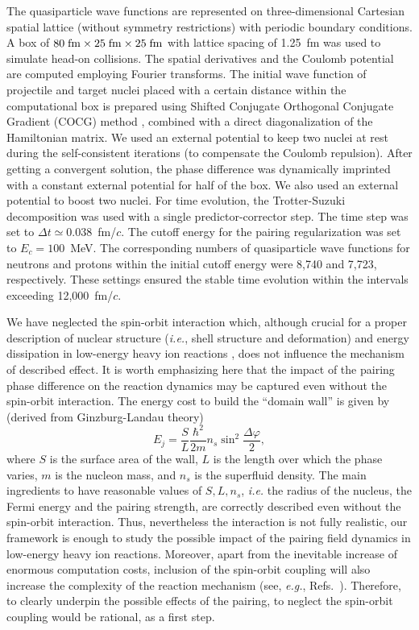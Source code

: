 \documentclass{PoS}
\begin{document}
The quasiparticle wave functions are represented on three-dimensional
Cartesian spatial lattice (without symmetry restrictions) with periodic boundary
conditions. A box of $80\;{\rm fm}\times25\;{\rm fm}\times25\;{\rm fm}$
with lattice spacing of 1.25~fm was used to simulate head-on collisions.
The spatial derivatives and the Coulomb potential are computed employing
Fourier transforms. The initial wave function of projectile and
target nuclei placed with a certain distance within the computational box is
prepared using Shifted Conjugate Orthogonal Conjugate Gradient (COCG)
method \cite{COCG}, combined with a direct diagonalization of the Hamiltonian
matrix. We used an external potential to keep two nuclei at rest during the
self-consistent iterations (to compensate the Coulomb repulsion). After getting
a convergent solution, the phase difference was dynamically imprinted with
a constant external potential for half of the box. We also used an external
potential to boost two nuclei. For time evolution, the Trotter-Suzuki decomposition
was used with a single predictor-corrector step. The time step was set to
$\Delta t \simeq 0.038$~fm/$c$. The cutoff energy for the pairing regularization
was set to $E_c=100$~MeV. The corresponding numbers of quasiparticle wave
functions for neutrons and protons within the initial cutoff energy were 8,740 and 7,723,
respectively. These settings ensured the stable time evolution within the 
intervals exceeding 12,000~fm/$c$.

We have neglected the spin-orbit interaction which, although
crucial for a proper description of nuclear structure (\textit{i.e.}, shell structure and
deformation) and energy dissipation in low-energy heavy ion reactions \cite{Umar(1986)},
does not influence the mechanism of described effect.
It is worth emphasizing here that the impact of the pairing phase difference on
the reaction dynamics may be captured even without the spin-orbit interaction.
The energy cost to build the ``domain wall'' is given by (derived from
Ginzburg-Landau theory) \cite{soliton}
\begin{equation}
E_j = \frac{S}{L}\frac{\hbar^2}{2m}n_s\sin^2\frac{\Delta\varphi}{2},
\label{Eq:E_junction}
\end{equation}
where $S$ is the surface area of the wall, $L$ is the length over which the phase
varies, $m$ is the nucleon mass, and $n_s$ is the superfluid density. The main
ingredients to have reasonable values of $S,L,n_s$, \textit{i.e.} the radius of
the nucleus, the Fermi energy and the pairing strength, are correctly described
even without the spin-orbit interaction. Thus, nevertheless the interaction is not
fully realistic, our framework is enough to study the possible impact of the pairing
field dynamics in low-energy heavy ion reactions. Moreover, apart from the inevitable
increase of enormous computation costs, inclusion of the spin-orbit coupling will
also increase the complexity of the reaction mechanism (see, \textit{e.g.},
Refs.~\cite{Maruhn(2006),Iwata(2011)}). Therefore, to clearly underpin the
possible effects of the pairing, to neglect the spin-orbit coupling would be
rational, as a first step.
\end{document}
